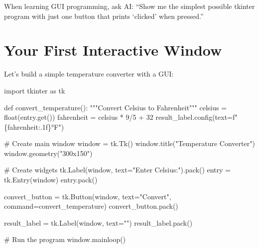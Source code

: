 \documentclass[
  letterpaper,
  DIV=11,
  numbers=noendperiod,
  oneside]{scrreprt}
\newenvironment{Shaded}{}{}
\newcommand{\BuiltInTok}[1]{\textcolor[rgb]{0.84,0.23,0.29}{#1}}
\newcommand{\CommentTok}[1]{\textcolor[rgb]{0.42,0.45,0.49}{#1}}
\newcommand{\DecValTok}[1]{\textcolor[rgb]{0.00,0.36,0.77}{#1}}
\newcommand{\ImportTok}[1]{\textcolor[rgb]{0.01,0.18,0.38}{#1}}
\newcommand{\KeywordTok}[1]{\textcolor[rgb]{0.84,0.23,0.29}{#1}}
\newcommand{\NormalTok}[1]{\textcolor[rgb]{0.14,0.16,0.18}{#1}}
\newcommand{\OperatorTok}[1]{\textcolor[rgb]{0.14,0.16,0.18}{#1}}
\newcommand{\SpecialCharTok}[1]{\textcolor[rgb]{0.00,0.36,0.77}{#1}}
\newcommand{\SpecialStringTok}[1]{\textcolor[rgb]{0.01,0.18,0.38}{#1}}
\newcommand{\StringTok}[1]{\textcolor[rgb]{0.01,0.18,0.38}{#1}}
\begin{document}
\begin{tcolorbox}[enhanced jigsaw, opacityback=0, colback=white, colframe=quarto-callout-tip-color-frame, breakable, titlerule=0mm, coltitle=black, rightrule=.15mm, colbacktitle=quarto-callout-tip-color!10!white, left=2mm, bottomtitle=1mm, bottomrule=.15mm, title=\textcolor{quarto-callout-tip-color}{\faLightbulb}\hspace{0.5em}{AI Partnership for GUIs}, opacitybacktitle=0.6, toptitle=1mm, leftrule=.75mm, arc=.35mm, toprule=.15mm]

When learning GUI programming, ask AI: ``Show me the simplest possible
tkinter program with just one button that prints `clicked' when
pressed.''

\end{tcolorbox}

\section{Your First Interactive
Window}\label{your-first-interactive-window}

Let's build a simple temperature converter with a GUI:

\begin{Shaded}
\begin{Highlighting}[]
\ImportTok{import}\NormalTok{ tkinter }\ImportTok{as}\NormalTok{ tk}

\KeywordTok{def}\NormalTok{ convert\_temperature():}
    \CommentTok{"""Convert Celsius to Fahrenheit"""}
\NormalTok{    celsius }\OperatorTok{=} \BuiltInTok{float}\NormalTok{(entry.get())}
\NormalTok{    fahrenheit }\OperatorTok{=}\NormalTok{ celsius }\OperatorTok{*} \DecValTok{9}\OperatorTok{/}\DecValTok{5} \OperatorTok{+} \DecValTok{32}
\NormalTok{    result\_label.config(text}\OperatorTok{=}\SpecialStringTok{f"}\SpecialCharTok{\{}\NormalTok{fahrenheit}\SpecialCharTok{:.1f\}}\SpecialStringTok{°F"}\NormalTok{)}

\CommentTok{\# Create main window}
\NormalTok{window }\OperatorTok{=}\NormalTok{ tk.Tk()}
\NormalTok{window.title(}\StringTok{"Temperature Converter"}\NormalTok{)}
\NormalTok{window.geometry(}\StringTok{"300x150"}\NormalTok{)}

\CommentTok{\# Create widgets}
\NormalTok{tk.Label(window, text}\OperatorTok{=}\StringTok{"Enter Celsius:"}\NormalTok{).pack()}
\NormalTok{entry }\OperatorTok{=}\NormalTok{ tk.Entry(window)}
\NormalTok{entry.pack()}

\NormalTok{convert\_button }\OperatorTok{=}\NormalTok{ tk.Button(window, text}\OperatorTok{=}\StringTok{"Convert"}\NormalTok{, command}\OperatorTok{=}\NormalTok{convert\_temperature)}
\NormalTok{convert\_button.pack()}

\NormalTok{result\_label }\OperatorTok{=}\NormalTok{ tk.Label(window, text}\OperatorTok{=}\StringTok{""}\NormalTok{)}
\NormalTok{result\_label.pack()}

\CommentTok{\# Run the program}
\NormalTok{window.mainloop()}
\end{Highlighting}
\end{Shaded}
\end{document}
